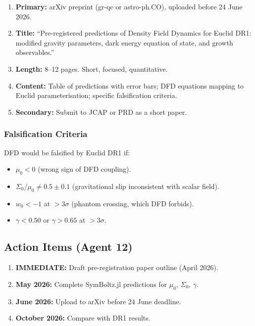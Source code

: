 \documentclass[11pt,a4paper]{article}
\begin{document}
\begin{enumerate}
\item \textbf{Primary:} arXiv preprint (gr-qc or astro-ph.CO), uploaded before 24 June 2026.
\item \textbf{Title:} ``Pre-registered predictions of Density Field Dynamics for Euclid DR1: modified gravity parameters, dark energy equation of state, and growth observables.''
\item \textbf{Length:} 8--12 pages. Short, focused, quantitative.
\item \textbf{Content:} Table of predictions with error bars; DFD equations mapping to Euclid parameterisation; specific falsification criteria.
\item \textbf{Secondary:} Submit to JCAP or PRD as a short paper.
\end{enumerate}

\subsubsection{Falsification Criteria}

DFD would be falsified by Euclid DR1 if:
\begin{itemize}
\item $\mu_0 < 0$ (wrong sign of DFD coupling).
\item $\Sigma_0 / \mu_0 \neq 0.5 \pm 0.1$ (gravitational slip inconsistent with scalar field).
\item $w_0 < -1$ at $> 3\sigma$ (phantom crossing, which DFD forbids).
\item $\gamma < 0.50$ or $\gamma > 0.65$ at $> 3\sigma$.
\end{itemize}

\subsection{Action Items (Agent 12)}

\begin{enumerate}
\item \textbf{IMMEDIATE:} Draft pre-registration paper outline (April 2026).
\item \textbf{May 2026:} Complete SymBoltz.jl predictions for $\mu_0$, $\Sigma_0$, $\gamma$.
\item \textbf{June 2026:} Upload to arXiv before 24 June deadline.
\item \textbf{October 2026:} Compare with DR1 results.
\end{enumerate}
\end{document}
